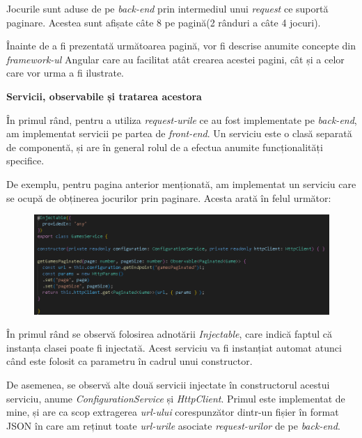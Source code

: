 \documentclass[12pt,a4paper]{report}
\begin{document}
Jocurile sunt aduse de pe \emph{back-end} prin intermediul unui \emph{request} ce suportă paginare. Acestea sunt afișate câte 8 pe  pagină(2 rânduri a câte 4 jocuri).

Înainte de a fi prezentată următoarea pagină, vor fi descrise anumite concepte din \emph{framework-ul} Angular care au facilitat atât crearea acestei pagini, cât și a celor care vor urma a fi ilustrate.

\bigskip
\textbf{Servicii, observabile și tratarea acestora}
\bigskip

În primul rând, pentru a utiliza \emph{request-urile} ce au fost implementate pe \emph{back-end}, am implementat servicii pe partea de \emph{front-end}. Un serviciu este o clasă separată de componentă, și are în general rolul de a efectua anumite funcționalități specifice. \cite{32}

De exemplu, pentru pagina anterior menționată, am implementat un serviciu care se ocupă de obținerea jocurilor prin paginare. Acesta arată în felul următor:

\begin{figure}[H]
\centering
\caption{}
\begin{adjustbox}{max size={\textwidth}{\textheight}}
\includegraphics{exemplu_32_games_paginated_service}
\end{adjustbox}

\caption*{}
\end{figure}

În primul rând se observă folosirea adnotării \emph{Injectable}, care indică faptul că instanța clasei poate fi injectată. Acest serviciu va fi instanțiat automat atunci când este folosit ca parametru în cadrul unui constructor.

De asemenea, se observă alte două servicii injectate în constructorul acestui serviciu, anume \emph{ConfigurationService} și \emph{HttpClient}. Primul este implementat de mine, și are ca scop extragerea \emph{url-ului} corespunzător dintr-un fișier în format JSON în care am reținut toate \emph{url-urile} asociate \emph{request-urilor} de pe \emph{back-end}.
\end{document}
